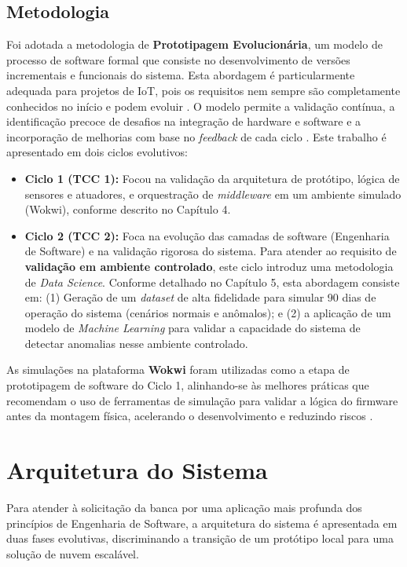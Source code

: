 \section{Metodologia}	
Foi adotada a metodologia de \textbf{Prototipagem Evolucionária}, um modelo de processo de software formal que consiste no desenvolvimento de versões incrementais e funcionais do sistema.
Esta abordagem é particularmente adequada para projetos de IoT, pois os requisitos nem sempre são completamente conhecidos no início e podem evoluir \cite{geeksforgeeks_prototyping}.
O modelo permite a validação contínua, a identificação precoce de desafios na integração de hardware e software e a incorporação de melhorias com base no \textit{feedback} de cada ciclo \cite{exforsys_prototyping}.
Este trabalho é apresentado em dois ciclos evolutivos:
\begin{itemize}
    \item \textbf{Ciclo 1 (TCC 1):} Focou na validação da arquitetura de protótipo, lógica de sensores e atuadores, e orquestração de \textit{middleware} em um ambiente simulado (Wokwi), conforme descrito no Capítulo 4.
    
    \item \textbf{Ciclo 2 (TCC 2):} Foca na evolução das camadas de software (Engenharia de Software) e na validação rigorosa do sistema.
Para atender ao requisito de \textbf{validação em ambiente controlado}, este ciclo introduz uma metodologia de \textit{Data Science}.
Conforme detalhado no Capítulo 5, esta abordagem consiste em: (1) Geração de um \textit{dataset} de alta fidelidade para simular 90 dias de operação do sistema (cenários normais e anômalos);
e (2) a aplicação de um modelo de \textit{Machine Learning} para validar a capacidade do sistema de detectar anomalias nesse ambiente controlado.
\end{itemize}

As simulações na plataforma \textbf{Wokwi} foram utilizadas como a etapa de prototipagem de software do Ciclo 1, alinhando-se às melhores práticas que recomendam o uso de ferramentas de simulação para validar a lógica do firmware antes da montagem física, acelerando o desenvolvimento e reduzindo riscos \cite{runtimerec_prototyping, motius_prototyping}.
\chapter{Arquitetura do Sistema}
\label{chap:arquitetura}

Para atender à solicitação da banca por uma aplicação mais profunda dos princípios de Engenharia de Software, a arquitetura do sistema é apresentada em duas fases evolutivas, discriminando a transição de um protótipo local para uma solução de nuvem escalável.
